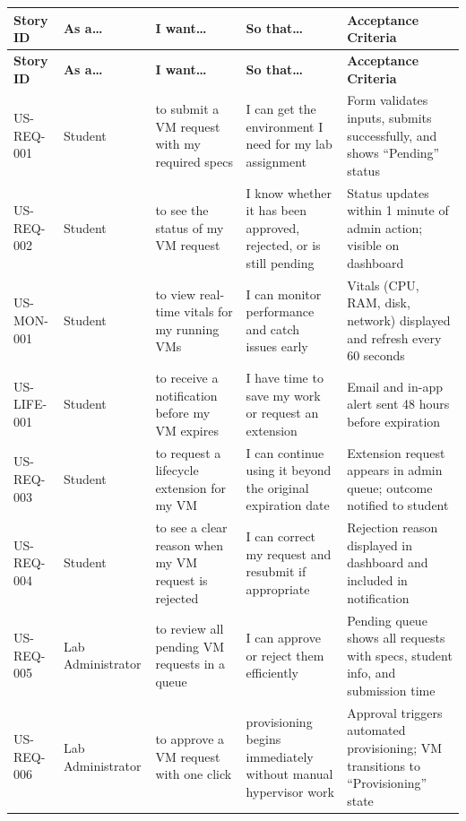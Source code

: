 \documentclass[12pt,letterpaper]{article}
\begin{document}
\begin{longtable}{L{2.2cm} L{2.5cm} L{3.5cm} L{3cm} L{3.3cm}}
  \toprule
  \textbf{Story ID} & \textbf{As a\ldots} & \textbf{I want\ldots} & \textbf{So that\ldots} & \textbf{Acceptance Criteria} \\
  \midrule
  \endfirsthead
  \toprule
  \textbf{Story ID} & \textbf{As a\ldots} & \textbf{I want\ldots} & \textbf{So that\ldots} & \textbf{Acceptance Criteria} \\
  \midrule
  \endhead
  \bottomrule
  \endfoot

  US-REQ-001 & Student & to submit a VM request with my required specs & I can get the environment I need for my lab assignment & Form validates inputs, submits successfully, and shows ``Pending'' status \\
  \addlinespace
  US-REQ-002 & Student & to see the status of my VM request & I know whether it has been approved, rejected, or is still pending & Status updates within 1 minute of admin action; visible on dashboard \\
  \addlinespace
  US-MON-001 & Student & to view real-time vitals for my running VMs & I can monitor performance and catch issues early & Vitals (CPU, RAM, disk, network) displayed and refresh every 60 seconds \\
  \addlinespace
  US-LIFE-001 & Student & to receive a notification before my VM expires & I have time to save my work or request an extension & Email and in-app alert sent 48 hours before expiration \\
  \addlinespace
  US-REQ-003 & Student & to request a lifecycle extension for my VM & I can continue using it beyond the original expiration date & Extension request appears in admin queue; outcome notified to student \\
  \addlinespace
  US-REQ-004 & Student & to see a clear reason when my VM request is rejected & I can correct my request and resubmit if appropriate & Rejection reason displayed in dashboard and included in notification \\
  \addlinespace
  US-REQ-005 & Lab Administrator & to review all pending VM requests in a queue & I can approve or reject them efficiently & Pending queue shows all requests with specs, student info, and submission time \\
  \addlinespace
  US-REQ-006 & Lab Administrator & to approve a VM request with one click & provisioning begins immediately without manual hypervisor work & Approval triggers automated provisioning; VM transitions to ``Provisioning'' state \\

\end{longtable}
\end{document}

